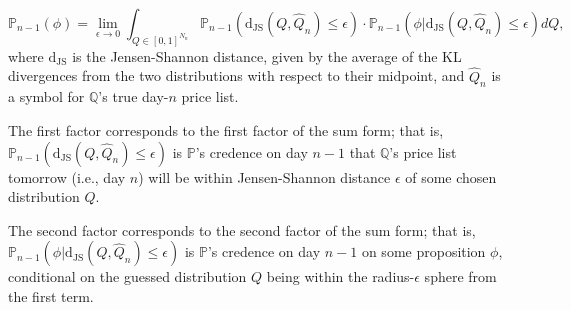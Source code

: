 \documentclass{article}
\begin{document}
$$\mathbb{P}_{n-1}(\phi)= \lim_{\epsilon \to 0} \int_{Q \in [0, 1]^{N_n}} \mathbb{P}_{n-1}(\mathrm{d_{JS}}(Q, \widehat{Q}_n) \leq \epsilon) \cdot \mathbb{P}_{n-1}(\phi \vert \mathrm{d_{JS}}(Q, \widehat{Q}_n) \leq \epsilon)dQ,$$ where $\mathrm{d_{JS}}$ is the Jensen-Shannon distance, given by the average of the KL divergences from the two distributions with respect to their midpoint, and $\widehat{Q}_n$ is a symbol for $\mathbb{Q}$'s true day-$n$ price list.

The first factor corresponds to the first factor of the sum form; that is, $ \mathbb{P}_{n-1}(\mathrm{d_{JS}}(Q, \widehat{Q}_n) \leq \epsilon)$ is $\mathbb{P}$'s credence on day $n-1$ that $\mathbb{Q}$'s price list tomorrow (i.e., day $n$) will be within Jensen-Shannon distance $\epsilon$ of some chosen distribution $Q$.

The second factor corresponds to the second factor of the sum form; that is, $ \mathbb{P}_{n-1}(\phi \vert \mathrm{d_{JS}}(Q, \widehat{Q}_n) \leq \epsilon)$ is $\mathbb{P}$'s credence on day $n-1$ on some proposition $\phi$, conditional on the guessed distribution $Q$ being within the radius-$\epsilon$ sphere from the first term. 
\end{document}
